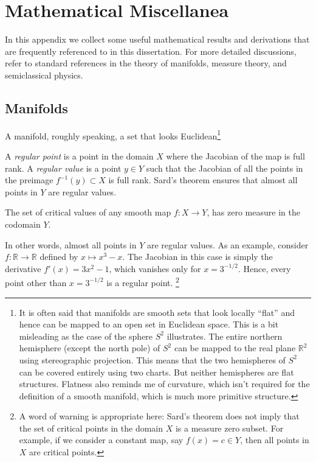 
\chapter{Mathematical Miscellanea}

In this appendix we collect some useful mathematical results and derivations that are frequently referenced to in this dissertation.
For more detailed discussions, refer to standard references in the theory of manifolds, measure theory, and semiclassical physics.

\section{Manifolds}

A manifold, roughly speaking, a set that looks Euclidean\footnote{It is often said that manifolds are smooth sets that look locally ``flat'' and hence can be mapped to an open set in Euclidean space.
This is a bit misleading as the case of the sphere $S^2$ illustrates.
The entire northern hemisphere (except the north pole) of $S^2$ can be mapped to the real plane $\mathbb{R}^{2}$ using stereographic projection.
This means that the two hemispheres of $S^2$ can be covered entirely using two charts.
But neither hemispheres are flat structures.
Flatness also reminds me of curvature, which isn't required for the definition of a smooth manifold, which is much more primitive structure.}

A \emph{regular point} is a point in the domain $X$ where the Jacobian of the map is full rank.
A \emph{regular value} is a point $y \in Y$ such that the Jacobian of all the points in the preimage $f^{-1}(y) \subset X$ is full rank.
Sard's theorem ensures that almost all points in $Y$ are regular values.
%
\begin{theorem}
  The set of critical values of any smooth map $f: X \to Y$, has zero measure in the codomain $Y$.
\end{theorem}

In other words, almost all points in $Y$ are regular values.
As an example, consider $f: \mathbb{R} \to \mathbb{R}$ defined by $x \mapsto x^3 - x$.
The Jacobian in this case is simply the derivative $f'(x) = 3x^2 - 1$, which vanishes only for $x = 3^{-1/2}$.
Hence, every point other than $x = 3^{-1/2}$ is a regular point.%
\footnote{A word of warning is appropriate here: Sard's theorem does not imply that the set of critical points in the domain $X$ is a measure zero subset.
For example, if we consider a constant map, say $f(x) = c \in Y$, then all points in $X$ are critical points.}

